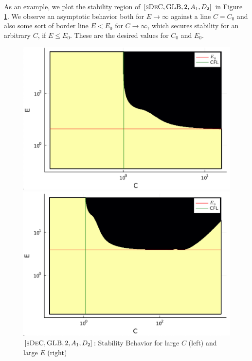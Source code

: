 As an example, we plot the stability region of $[\textsc{sDeC},\textsc{GLB},2, A_1,D_2]$ in Figure \ref{fig: exa_limits}. We observe an asymptotic behavior both for $E\rightarrow \infty$ against a line $C=C_0$ and also some sort of border line $E<E_0$ for $C\rightarrow \infty$, which secures stability for an arbitrary $C$, if $E\le E_0$. These are the desired values for $C_0$ and $E_0$.
\begin{figure}
	\centering
	\begin{minipage}[t]{0.45\textwidth}
		\includegraphics[width=\textwidth]{pdepics/IMEXsDeC2_GLB_diff2_adv1_C_log.png}
	\end{minipage} 
	\begin{minipage}[t]{0.45\textwidth}
		\includegraphics[width=\textwidth]{pdepics/IMEXsDeC2_GLB_diff2_adv1_E_log.png}
	\end{minipage}
	\caption{$[\textsc{sDeC},\textsc{GLB},2, A_1,D_2]$: Stability Behavior for large $C$ (left) and large $E$ (right)}
	\label{fig: exa_limits}
\end{figure}


